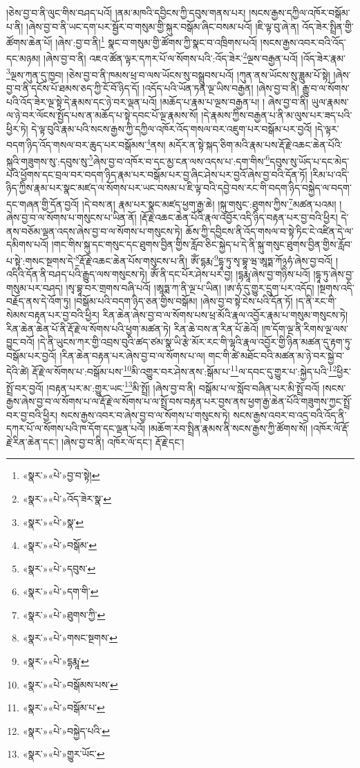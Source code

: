 །ཅེས་བྱ་བ་ནི་ལུང་གིས་བཤད་པའོ། །ནམ་མཁའི་དབྱིངས་ཀྱི་དབུས་གནས་པར། །སངས་རྒྱས་དཀྱིལ་འཁོར་བསྒོམ་པ་ནི། །ཞེས་བྱ་བ་ནི་ཡང་དག་པར་སྦྱོར་བ་གསུམ་གྱི་སྐུར་བསྒོམ་ཞིང་བསམ་པའོ། །ཇི་ལྟ་བུ་ཞེ་ན། འོད་ཟེར་སྤྲིན་གྱི་ཚོགས་ཆེན་པོ། །ཞེས་:བྱ་བ་ནི།\footnote{«སྣར་»«པེ་»བྱ་བ་སྟེ།} སྣང་བ་གསུམ་གྱི་ཚོགས་ཀྱི་སྣང་བ་འཁྲིགས་པའོ། །སངས་རྒྱས་འབར་བའི་འོད་དང་མཉམ། །ཞེས་བྱ་བ་ནི། འཇའ་ཚོན་ལྟར་དཀར་པོ་ལ་སོགས་པའི་:འོད་ཟེར་\footnote{«སྣར་»«པེ་»འོད་ཟེར་སྣ་}ལྔས་བརྒྱན་པའོ། །འོད་ཟེར་རྣམ་\footnote{«སྣར་»«པེ་»སྣ་}ལྔས་ཀུན་དུ་ཁྱབ། །ཅེས་བྱ་བ་ནི་ཁམས་ཕྲ་བ་ལས་ཡོངས་སུ་བསྒྲུབས་པའོ། །ཀུན་ནས་ཡོངས་སུ་ཟླུམ་པོ་སྟེ། །ཞེས་བྱ་བ་ནི་དངོས་པོ་ཐམས་ཅད་ཀྱི་ངོ་བོ་ཉིད་དོ། །འདོད་པའི་ཡོན་ཏན་ལྔ་ཡིས་བརྒྱན། །ཞེས་བྱ་བ་ནི། རྒྱུ་བ་ལ་སོགས་པའི་འོད་ཟེར་ལྔ་སྟེ་དེ་རྣམས་དང་ཉེ་བར་ལྡན་པའོ། །མཆོད་པ་རྣམ་པ་ལྔས་བརྒྱན་པ། །
ཞེས་བྱ་བ་ནི། ཡུལ་རྣམས་ལ་ཉེ་བར་ལོངས་སྤྱོད་པས་ན་མཆོད་པ་སྟེ་དབང་པོ་ལྔ་རྣམས་སོ། །དེ་རྣམས་ཀྱིས་བརྒྱན་པ་ནི་མ་ལུས་པར་ཟད་པའི་ཕྱིར་ཏེ། དེ་ལྟ་བུའི་རྣམ་པའི་སངས་རྒྱས་ཀྱི་དཀྱིལ་འཁོར་འོད་གསལ་བར་འཇུག་པར་བསྒོམ་པར་བྱའོ། །དེ་ལྟར་བདག་ཉིད་འོད་གསལ་བར་ཆུད་པར་བསྒོམས་\footnote{«སྣར་»«པེ་»བསྒོམ་}ནས། མདོར་ན་སྟེ་སྐད་ཅིག་མའི་རྣམ་པས་རྡོ་རྗེ་འཆང་ཆེན་པོའི་སྐུའི་གཟུགས་སུ་:དབུས་སུ་\footnote{«སྣར་»«པེ་»དབུས་}ཞེས་བྱ་བ་འཁོར་བ་དང་མྱ་ངན་ལས་འདས་པ་:དག་གིས་\footnote{«སྣར་»«པེ་»དག་གི་}དབུས་སུ་ཡོད་པ་དང་མེད་པའི་ཕྱོགས་དང་བྲལ་བར་བདག་ཉིད་རྣམ་པར་བསྒོམ་པར་བྱ་ཞིང་ཤེས་པར་བྱའོ་ཞེས་བྱ་བའི་དོན་ཏོ། །རིམ་པ་འདི་ཉིད་ཀྱིས་རྣམ་པར་སྣང་མཛད་ལ་སོགས་པར་ཡང་བསམ་པ་ཇི་ལྟ་བའི་དབྱེ་བས་རང་གི་བདག་ཉིད་བསྐྱེད་ལ་བདག་དང་གཞན་གྱི་དོན་བྱའོ། །དེ་བས་ན། རྣམ་པར་སྣང་མཛད་ཕྱག་རྒྱ་ཆེ། །སྐུ་གསུང་:ཐུགས་ཀྱིས་\footnote{«སྣར་»«པེ་»ཐུགས་ཀྱི་}མཚན་པའམ། །ཞེས་བྱ་བ་ལ་སོགས་པ་གསུངས་པ་ཡིན་ནོ། །རྡོ་རྗེ་འཆང་ཆེན་པོའི་རྣལ་འབྱོར་འདི་ཉིད་བརྟན་པར་བྱ་བའི་ཕྱིར། དེ་ནས་བཅོམ་ལྡན་འདས་ཞེས་བྱ་བ་ལ་སོགས་པ་གསུངས་ཏེ། ཆོས་ཀྱི་དབྱིངས་ནི་འོད་གསལ་བ་སྟེ་ཏིང་ངེ་འཛིན་དེ་ལ་དམིགས་པའོ། །གང་གིས་སྐུ་དང་གསུང་དང་ཐུགས་བྱིན་གྱིས་རློབ་ཅིང་སྐྱེད་པ་དེ་ནི་སྐུ་གསུང་ཐུགས་བྱིན་གྱིས་རློབ་པ་སྟེ་:གསང་སྔགས་དེ་\footnote{«སྣར་»«པེ་»གསང་སྔགས་}རྡོ་རྗེ་འཆང་ཆེན་པོས་གསུངས་པ་ནི། ཨོཾ་དྷརྨ་\footnote{«སྣར་»«པེ་»དྷརྨཱ་}དྷཱ་ཏུ་སྭ་བྷཱ་ཝ་ཨཱཏྨ་ཀོ྅ཧཾ་ཞེས་བྱ་བའོ། །འདིའི་དོན་ནི་བཤད་པའི་རྒྱུད་ལས་གསུངས་ཏེ། ཨོཾ་ནི་དང་པོར་ཤེས་པར་བྱ། །དྷརྨཱ་ཞེས་བྱ་གཉིས་པའོ། །དྷཱ་ཏུ་ཞེས་བྱ་གསུམ་པར་བཤད། །སྭ་བྷཱ་བར་གྲགས་བཞི་པའོ། །ཨཱཏྨ་ཀ་ནི་ལྔ་པ་ཡིན། །ཨ་ཧཾ་དུ་གྱུར་དྲུག་པར་འདོད། །སྔགས་འདི་བརྗོད་ནས་དེ་འོག་ཏུ། །བསྒོམ་པའི་བདག་ཉིད་ཅན་གྱིས་བསྒོམ། །ཞེས་བྱ་བ་སྟེ་ངེས་པའི་དོན་ཏོ། །ད་ནི་རང་གི་སེམས་བརྟན་པར་བྱ་བའི་ཕྱིར། རིན་ཆེན་ཞེས་བྱ་བ་ལ་སོགས་པས་ཕྲ་མོའི་རྣལ་འབྱོར་རྣམ་པ་གསུམ་གསུངས་ཏེ། རིན་ཆེན་ཆེན་པོ་ནི་རྡོ་རྗེ་ལ་སོགས་པའི་ཕྱག་མཚན་ཏེ། རིན་ཆེ་བས་ན་རིན་པོ་ཆེའོ། །ཁ་དོག་ལྔ་ནི་རིགས་ལྔ་ལས་བྱུང་བའོ། །དེ་ནི་ཡུངས་ཀར་གྱི་འབྲས་བུའི་ཚད་ཙམ་སྣ་ཡི་རྩེ་མོར་རང་གི་ལྷའི་རྣལ་འབྱོར་གྱི་ཉིན་མཚན་དུ་རྟག་ཏུ་བསྒོམ་པར་བྱའོ། །རིན་ཆེན་བརྟན་པར་ཞེས་བྱ་བ་ལ་སོགས་པ་ལ། གང་གི་ཚེ་མཐོང་བའི་མཚན་མ་ཉེ་བར་སྐྱེ་བ་དེའི་ཚེ། རྡོ་རྗེ་ལ་སོགས་པ་:བསྒོམ་པས་\footnote{«སྣར་»«པེ་»བསྒོམས་པས་}མི་འགྱུར་བར་ཤེས་ནས་:སྒོམ་པ་\footnote{«སྣར་»«པེ་»བསྒོམ་པ་}ལ་དབང་དུ་གྱུར་པ་:སྐྱེད་པའི་\footnote{«སྣར་»«པེ་»བསྐྱེད་པའི་}ཕྱིར་སྤྲོ་བར་བྱའོ། །བརྟན་པར་མ་:གྱུར་ཡང་\footnote{«སྣར་»«པེ་»གྱུར་ཡོང་}མི་སྤྲོ། །ཞེས་བྱ་བ་ནི། བསྒོམ་པ་ལ་སློབ་བཞིན་པར་མི་སྤྲོ་བའོ། །སངས་རྒྱས་ཞེས་བྱ་བ་ལ་སོགས་པ་ལ་རྡོ་རྗེ་ལ་སོགས་པ་ལ་སྤྲོ་བས་བརྟན་པར་བྱས་ནས་ཕྱག་རྒྱ་ཆེན་པོའི་གཟུགས་ཀྱང་སྤྲོ་བར་བྱ་བའི་ཕྱིར། སངས་རྒྱས་འབར་བ་ཞེས་བྱ་བ་ལ་སོགས་པ་གསུངས་ཏེ། སངས་རྒྱས་འབར་བ་འདྲ་བའི་འོད་ནི་དཀར་པོ་ལ་སོགས་པའི་ཁ་དོག་དང་ལྡན་པའོ། །མཆོག་རབ་སྤྲིན་རྣམས་ནི་སངས་རྒྱས་ཀྱི་ཚོགས་སོ། །འཁོར་ལོ་རྡོ་རྗེ་རིན་ཆེན་དང་། །ཞེས་བྱ་བ་ནི། འཁོར་ལོ་དང་། རྡོ་རྗེ་དང་། 